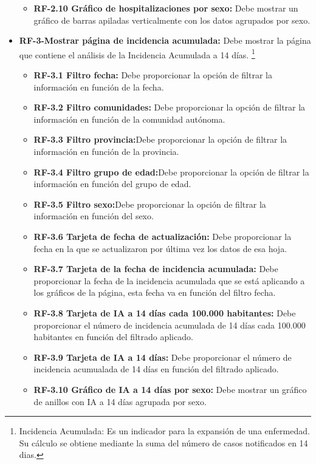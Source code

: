 \begin{itemize}
\begin{itemize}
            \item \textbf{RF-2.10 Gráfico de hospitalizaciones por sexo:} Debe mostrar un gráfico de barras apiladas verticalmente con los datos agrupados por sexo.
    \end{itemize}
    \item \textbf{RF-3-Mostrar página de incidencia acumulada:} Debe mostrar la página que contiene el análisis de la Incidencia Acumulada a 14 días. \footnote{Incidencia Acumulada: Es un indicador para la expansión de una enfermedad. Su cálculo se obtiene mediante la suma del número de casos notificados en 14 dias.}
    \begin{itemize}
        \tightlist
            \item \textbf{RF-3.1 Filtro fecha:} Debe proporcionar la opción de filtrar la información en función de la fecha.
            \item \textbf{RF-3.2 Filtro comunidades:} Debe proporcionar la opción de filtrar la información en función de la comunidad autónoma.
            \item \textbf{RF-3.3 Filtro provincia:}Debe proporcionar la opción de filtrar la información en función de la provincia.
            \item \textbf{RF-3.4 Filtro grupo de edad:}Debe proporcionar la opción de filtrar la información en función del grupo de edad.
            \item \textbf{RF-3.5 Filtro sexo:}Debe proporcionar la opción de filtrar la información en función del sexo.
            \item \textbf{RF-3.6 Tarjeta de fecha de actualización:} Debe proporcionar la fecha en la que se actualizaron por última vez los datos de esa hoja.
            \item \textbf{RF-3.7 Tarjeta de la fecha de incidencia acumulada:} Debe proporcionar la fecha de la incidencia acumulada que se está aplicando a los gráficos de la página, esta fecha va en función del filtro fecha.
            \item \textbf{RF-3.8 Tarjeta de IA a 14 días cada 100.000 habitantes:} Debe proporcionar el número de incidencia acumulada de 14 días cada 100.000 habitantes en función del filtrado aplicado.
            \item \textbf{RF-3.9 Tarjeta de IA a 14 días:} Debe proporcionar el número de incidencia acumualada de 14 días en función del filtrado aplicado.
            \item \textbf{RF-3.10 Gráfico de IA a 14 días por sexo:} Debe mostrar un gráfico de anillos con IA a 14 días agrupada por sexo.

\end{itemize}
\end{itemize}
